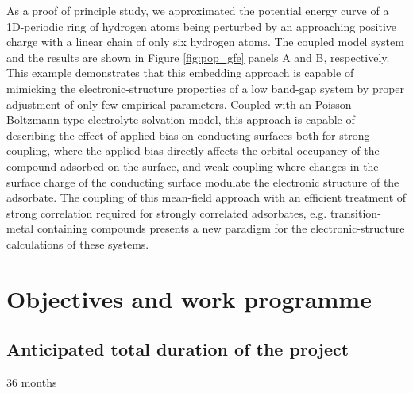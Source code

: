 \documentclass[a4paper,11pt,headings=normal]{scrartcl}
\begin{document}
\begin{itemize}
\noindent
As a proof of principle study, we approximated the potential energy curve of a 
1D-periodic ring of hydrogen atoms being perturbed by an approaching positive  
charge with a linear chain of only six hydrogen atoms. The coupled model system 
and the results are shown in Figure \ref{fig:pop_gfe} panels A and B, 
respectively. This example demonstrates that this embedding 
approach is capable of mimicking the electronic-structure properties of a low 
band-gap system by proper adjustment of only few empirical parameters. 
Coupled with an Poisson--Boltzmann type electrolyte solvation 
model,\autocite{stein2019} this approach 
is capable of describing the effect of applied bias on conducting surfaces both 
for strong coupling, where the applied bias directly affects the orbital 
occupancy of the compound  adsorbed on the surface, and weak 
coupling where changes in the surface charge of the conducting surface modulate 
the electronic structure of the adsorbate. The coupling of this mean-field 
approach with an efficient treatment of strong correlation required for strongly 
correlated adsorbates, e.g. transition-metal containing compounds presents a new 
paradigm for the electronic-structure calculations of these systems.


\section{Objectives and work programme}

\subsection{Anticipated total duration of the project}
36 months


\end{itemize}
\end{document}
